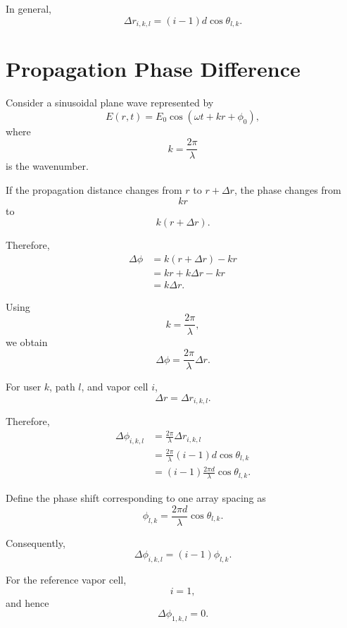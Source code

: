 \documentclass[12pt,a4paper]{article}
\begin{document}
In general,
\[
\Delta r_{i,k,l}
=
(i-1)d\cos\theta_{l,k}.
\]

\section{Propagation Phase Difference}

Consider a sinusoidal plane wave represented by
\begin{equation}
E(r,t)
=
E_0
\cos
\left(
\omega t+kr+\phi_0
\right),
\tag{6}
\end{equation}
where
\[
k=\frac{2\pi}{\lambda}
\]
is the wavenumber.

If the propagation distance changes from \(r\) to
\(r+\Delta r\), the phase changes from
\[
kr
\]
to
\[
k(r+\Delta r).
\]

Therefore,
\[
\begin{aligned}
\Delta\phi
&=
k(r+\Delta r)-kr\\
&=
kr+k\Delta r-kr\\
&=
k\Delta r.
\end{aligned}
\]

Using
\[
k=\frac{2\pi}{\lambda},
\]
we obtain
\begin{equation}
\boxed{
\Delta\phi
=
\frac{2\pi}{\lambda}\Delta r.
}
\tag{7}
\end{equation}

For user \(k\), path \(l\), and vapor cell \(i\),
\[
\Delta r
=
\Delta r_{i,k,l}.
\]

Therefore,
\[
\begin{aligned}
\Delta\phi_{i,k,l}
&=
\frac{2\pi}{\lambda}
\Delta r_{i,k,l}\\
&=
\frac{2\pi}{\lambda}
(i-1)d\cos\theta_{l,k}\\
&=
(i-1)
\frac{2\pi d}{\lambda}
\cos\theta_{l,k}.
\end{aligned}
\]

Define the phase shift corresponding to one array spacing as
\begin{equation}
\boxed{
\phi_{l,k}
=
\frac{2\pi d}{\lambda}
\cos\theta_{l,k}.
}
\tag{8}
\end{equation}

Consequently,
\begin{equation}
\boxed{
\Delta\phi_{i,k,l}
=
(i-1)\phi_{l,k}.
}
\tag{9}
\end{equation}

For the reference vapor cell,
\[
i=1,
\]
and hence
\[
\Delta\phi_{1,k,l}=0.
\]
\end{document}

